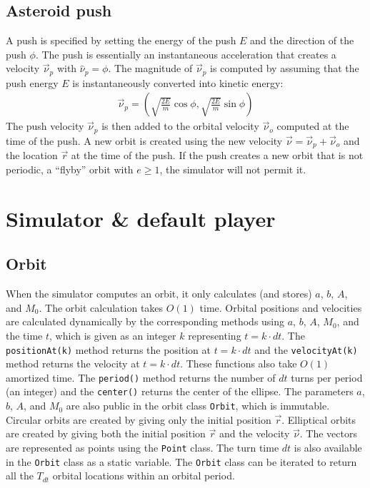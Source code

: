 \begin{appendices}
\subsection{Asteroid push}

A push is specified by setting the energy of the push $E$ and the direction of the push $\phi$. The push is essentially an instantaneous acceleration that creates a velocity $\vec{\nu}_p$ with $\hat{\nu}_p = \phi$. The magnitude of $\vec{\nu}_p$ is computed by assuming that the push energy $E$ is instantaneously converted into kinetic energy:
\begin{eqnarray*}
\vec{\nu}_p = (\sqrt{\frac{2E}{m}}\cos{\phi},\sqrt{\frac{2E}{m}}\sin{\phi})
\end{eqnarray*}
The push velocity $\vec{\nu}_p$ is then added to the orbital velocity $\vec{\nu}_o$ computed at the time of the push. A new orbit is created using the new velocity $\vec{\nu} = \vec{\nu}_p + \vec{\nu}_o$ and the location $\vec{r}$ at the time of the push. If the push creates a new orbit that is not periodic, a ``flyby'' orbit with $e \geq 1$, the simulator will not permit it.

\section{Simulator \& default player}

\subsection{Orbit}

When the simulator computes an orbit, it only calculates (and stores) $a$, $b$, $A$, and $M_0$. The orbit calculation takes $O(1)$ time. Orbital positions and velocities are calculated dynamically by the corresponding methods using $a$, $b$, $A$, $M_0$, and the time $t$, which is given as an integer $k$ representing $t = k \cdot dt$. The \verb#positionAt(k)# method returns the position at $t = k \cdot dt$ and the \verb#velocityAt(k)# method returns the velocity at $t = k \cdot dt$. These functions also take $O(1)$ amortized time. The \verb#period()# method returns the number of $dt$ turns per period (an integer) and the \verb#center()# returns the center of the ellipse. The parameters $a$, $b$, $A$, and $M_0$ are also public in the orbit class \verb#Orbit#, which is immutable. Circular orbits are created by giving only the initial position $\vec{r}$. Elliptical orbits are created by giving both the initial position $\vec{r}$ and the velocity $\vec{\nu}$. The vectors are represented as points using the \verb#Point# class. The turn time $dt$ is also available in the \verb#Orbit# class as a static variable. The \verb#Orbit# class can be iterated to return all the $T_{dt}$ orbital locations within an orbital period.


\end{appendices}
